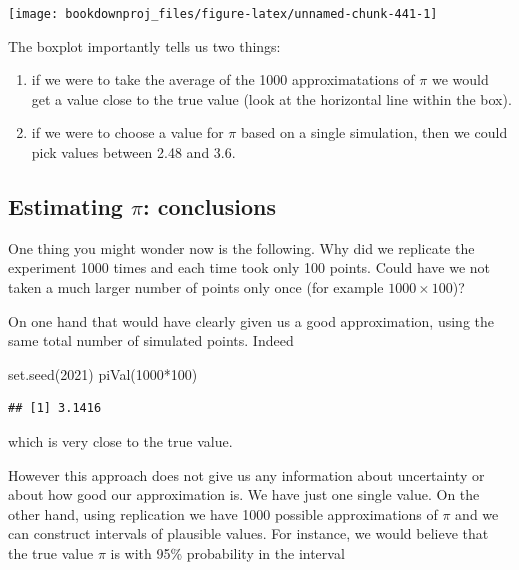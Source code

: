 \documentclass[
]{book}
\newenvironment{Shaded}{\begin{snugshade}}{\end{snugshade}}
\newcommand{\DecValTok}[1]{\textcolor[rgb]{0.00,0.00,0.81}{#1}}
\newcommand{\FunctionTok}[1]{\textcolor[rgb]{0.00,0.00,0.00}{#1}}
\newcommand{\NormalTok}[1]{#1}
\newcommand{\SpecialCharTok}[1]{\textcolor[rgb]{0.00,0.00,0.00}{#1}}
\theoremstyle{definition}
\theoremstyle{definition}
\theoremstyle{definition}
\theoremstyle{definition}
\theoremstyle{remark}
\begin{document}
\begin{center}\texttt{[image: bookdownproj\_files/figure-latex/unnamed-chunk-441-1]} \end{center}

The boxplot importantly tells us two things:

\begin{enumerate}
\def\labelenumi{\arabic{enumi}.}
\item
  if we were to take the average of the 1000 approximatations of \(\pi\) we would get a value close to the true value (look at the horizontal line within the box).
\item
  if we were to choose a value for \(\pi\) based on a single simulation, then we could pick values between 2.48 and 3.6.
\end{enumerate}

\hypertarget{estimating-pi-conclusions}{%
\subsection{\texorpdfstring{Estimating \(\pi\): conclusions}{Estimating \textbackslash pi: conclusions}}\label{estimating-pi-conclusions}}

One thing you might wonder now is the following. Why did we replicate the experiment 1000 times and each time took only 100 points. Could have we not taken a much larger number of points only once (for example \(1000\times 100\))?

On one hand that would have clearly given us a good approximation, using the same total number of simulated points. Indeed

\begin{Shaded}
\begin{Highlighting}[]
\FunctionTok{set.seed}\NormalTok{(}\DecValTok{2021}\NormalTok{)}
\FunctionTok{piVal}\NormalTok{(}\DecValTok{1000}\SpecialCharTok{*}\DecValTok{100}\NormalTok{)}
\end{Highlighting}
\end{Shaded}

\begin{verbatim}
## [1] 3.1416
\end{verbatim}

which is very close to the true value.

However this approach does not give us any information about uncertainty or about how good our approximation is. We have just one single value. On the other hand, using replication we have 1000 possible approximations of \(\pi\) and we can construct intervals of plausible values. For instance, we would believe that the true value \(\pi\) is with 95\% probability in the interval
\end{document}
